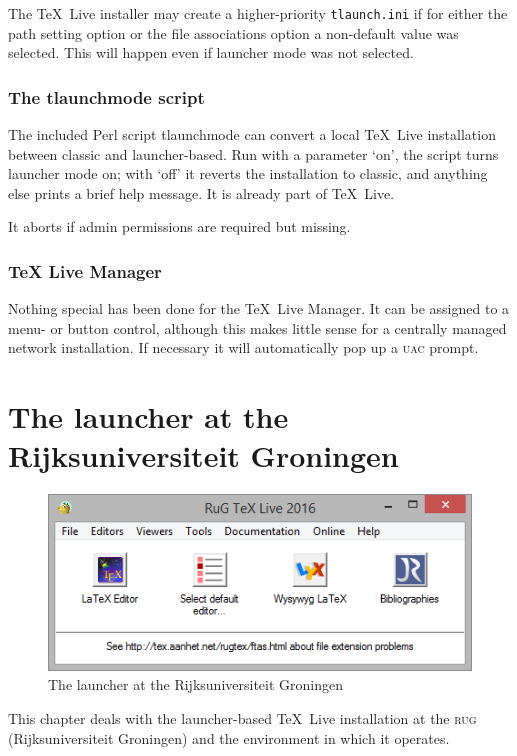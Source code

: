 \documentclass[11pt,a4paper,oneside]{report}
\def\TL{\TeX~Live}
\def\mysc#1{{\rmfamily\textsc{#1}}}
\def\RUG{\mysc{rug}}
\begin{document}
The \TL{} installer may create a higher-priority
\texttt{tlaunch.ini} if for either the path setting option or the
file associations option a non-default value was selected. This will
happen even if launcher mode was not selected.

\subsection{The tlaunchmode script}
\label{sec:tlaunchmode}

The included Perl script tlaunchmode can convert a local \TL{}
installation between classic and launcher-based. Run with a
parameter `on', the script turns launcher mode on; with `off' it
reverts the installation to classic, and anything else prints a
brief help message.  It is already part of \TL.

It aborts if admin permissions are required but missing.

\subsection{\TeX{} Live Manager}

Nothing special has been done for the \TL{} Manager. It can be
assigned to a menu- or button control, although this makes little
sense for a centrally managed network installation. If necessary it
will automatically pop up a \textsc{uac} prompt.

\chapter[The launcher at the RUG]{The launcher at the
  Rijksuniversiteit Groningen}
\label{chap:rug}

\begin{figure}[tb]
  \centering
  \includegraphics[width=.7\linewidth]{figures/tlaunch_rug}
  \caption{The launcher at the Rijksuniversiteit Groningen}
  \label{fig:launcher_rug}
\end{figure}

This chapter deals with the launcher-based \TL{} installation at the
\RUG{} (Rijksuniversiteit Groningen) and the environment in which it
operates.
\end{document}
